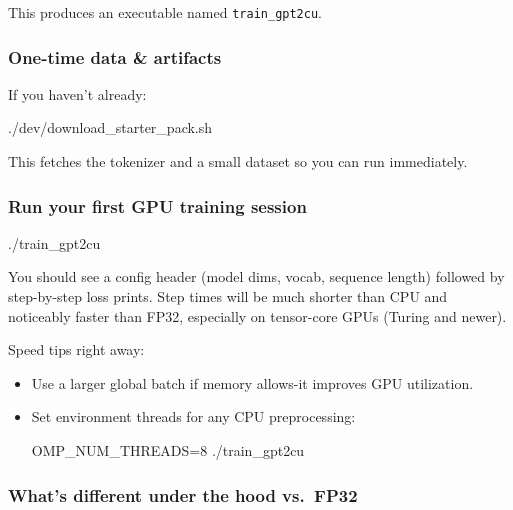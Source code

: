 \documentclass[
  letterpaper,
  DIV=11,
  numbers=noendperiod]{scrreprt}
\newenvironment{Shaded}{\begin{snugshade}}{\end{snugshade}}
\newcommand{\ExtensionTok}[1]{\textcolor[rgb]{0.00,0.23,0.31}{#1}}
\newcommand{\NormalTok}[1]{\textcolor[rgb]{0.00,0.23,0.31}{#1}}
\newcommand{\OperatorTok}[1]{\textcolor[rgb]{0.37,0.37,0.37}{#1}}
\newcommand{\VariableTok}[1]{\textcolor[rgb]{0.07,0.07,0.07}{#1}}
\begin{document}
This produces an executable named \texttt{train\_gpt2cu}.

\subsubsection{One-time data \&
artifacts}\label{one-time-data-artifacts}

If you haven't already:

\begin{Shaded}
\begin{Highlighting}[]
\ExtensionTok{./dev/download\_starter\_pack.sh}
\end{Highlighting}
\end{Shaded}

This fetches the tokenizer and a small dataset so you can run
immediately.

\subsubsection{Run your first GPU training
session}\label{run-your-first-gpu-training-session}

\begin{Shaded}
\begin{Highlighting}[]
\ExtensionTok{./train\_gpt2cu}
\end{Highlighting}
\end{Shaded}

You should see a config header (model dims, vocab, sequence length)
followed by step-by-step loss prints. Step times will be much shorter
than CPU and noticeably faster than FP32, especially on tensor-core GPUs
(Turing and newer).

Speed tips right away:

\begin{itemize}
\item
  Use a larger global batch if memory allows-it improves GPU
  utilization.
\item
  Set environment threads for any CPU preprocessing:

\begin{Shaded}
\begin{Highlighting}[]
\VariableTok{OMP\_NUM\_THREADS}\OperatorTok{=}\NormalTok{8 }\ExtensionTok{./train\_gpt2cu}
\end{Highlighting}
\end{Shaded}
\end{itemize}

\subsubsection{What's different under the hood
vs.~FP32}\label{whats-different-under-the-hood-vs.-fp32}
\end{document}
